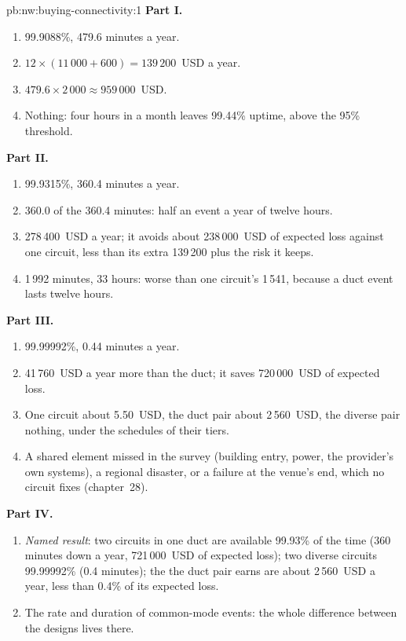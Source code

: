 \begin{solution}{pb:nw:buying-connectivity:1}
\textbf{Part I.}
\begin{enumerate}
\item 99.9088\%, 479.6 minutes a year.
\item $12 \times (11\,000 + 600) = 139\,200$~USD a year.
\item $479.6 \times 2\,000 \approx 959\,000$~USD.
\item Nothing: four hours in a month leaves 99.44\% uptime, above the 95\% threshold.
\end{enumerate}
\textbf{Part II.}
\begin{enumerate}[resume]
\item 99.9315\%, 360.4 minutes a year.
\item 360.0 of the 360.4 minutes: half an event a year of twelve hours.
\item 278\,400~USD a year; it avoids about 238\,000~USD of expected loss against one circuit, less than its extra 139\,200 plus the risk it keeps.
\item 1\,992 minutes, 33 hours: worse than one circuit's 1\,541, because a duct event lasts twelve hours.
\end{enumerate}
\textbf{Part III.}
\begin{enumerate}[resume]
\item 99.99992\%, 0.44 minutes a year.
\item 41\,760~USD a year more than the duct; it saves 720\,000~USD of expected loss.
\item One circuit about 5.50~USD, the duct pair about 2\,560~USD, the diverse pair nothing, under the schedules of their tiers.
\item A shared element missed in the survey (building entry, power, the provider's own systems), a regional disaster, or a failure at the venue's
  end, which no circuit fixes (chapter~28).
\end{enumerate}
\textbf{Part IV.}
\begin{enumerate}[resume]
\item \emph{Named result}: two circuits in one duct are available 99.93\% of the time (360 minutes down a year, 721\,000~USD of expected loss); two
  diverse circuits 99.99992\% (0.4 minutes); the  the duct pair earns are about 2\,560~USD a year, less than 0.4\% of its expected loss.
\item The rate and duration of common-mode events: the whole difference between the designs lives there.

\end{enumerate}
\end{solution}
